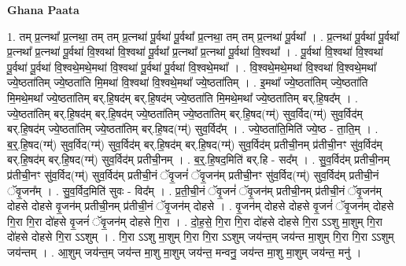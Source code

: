 \documentclass[17pt]{extarticle}
\begin{document}
\textbf{Ghana Paata } \newline

1. तम् प्र॒त्नथा᳚ प्र॒त्नथा॒ तम् तम् प्र॒त्नथा॑ पू॒र्वथा॑ पू॒र्वथा᳚ प्र॒त्नथा॒ तम् तम् प्र॒त्नथा॑ पू॒र्वथा᳚ । . प्र॒त्नथा॑ पू॒र्वथा॑ पू॒र्वथा᳚ प्र॒त्नथा᳚ प्र॒त्नथा॑ पू॒र्वथा॑ वि॒श्वथा॑ वि॒श्वथा॑ पू॒र्वथा᳚ प्र॒त्नथा᳚ प्र॒त्नथा॑ पू॒र्वथा॑ वि॒श्वथा᳚ । . पू॒र्वथा॑ वि॒श्वथा॑ वि॒श्वथा॑ पू॒र्वथा॑ पू॒र्वथा॑ वि॒श्वथे॒मथे॒मथा॑ वि॒श्वथा॑ पू॒र्वथा॑ पू॒र्वथा॑ वि॒श्वथे॒मथा᳚ । . वि॒श्वथे॒मथे॒मथा॑ वि॒श्वथा॑ वि॒श्वथे॒मथा᳚ ज्ये॒ष्ठता॑तिम् ज्ये॒ष्ठता॑ति मि॒मथा॑ वि॒श्वथा॑ वि॒श्वथे॒मथा᳚ ज्ये॒ष्ठता॑तिम् । . इ॒मथा᳚ ज्ये॒ष्ठता॑तिम् ज्ये॒ष्ठता॑ति मि॒मथे॒मथा᳚ ज्ये॒ष्ठता॑तिम् बर्.हि॒षद॑म् बर्.हि॒षद॑म् ज्ये॒ष्ठता॑ति मि॒मथे॒मथा᳚ ज्ये॒ष्ठता॑तिम् बर्.हि॒षद᳚म् । . ज्ये॒ष्ठता॑तिम् बर्.हि॒षद॑म् बर्.हि॒षद॑म् ज्ये॒ष्ठता॑तिम् ज्ये॒ष्ठता॑तिम् बर्.हि॒षद(ग्म्॑) सुव॒र्विद(ग्म्॑) सुव॒र्विद॑म् बर्.हि॒षद॑म् ज्ये॒ष्ठता॑तिम् ज्ये॒ष्ठता॑तिम् बर्.हि॒षद(ग्म्॑) सुव॒र्विद᳚म् । . ज्ये॒ष्ठता॑ति॒मिति॑ ज्ये॒ष्ठ - ता॒ति॒म् । . ब॒र्॒.हि॒षद(ग्म्॑) सुव॒र्विद(ग्म्॑) सुव॒र्विद॑म् बर्.हि॒षद॑म् बर्.हि॒षद(ग्म्॑) सुव॒र्विद॑म् प्रतीची॒नम् प्र॑तीची॒नꣳ सु॑व॒र्विद॑म् बर्.हि॒षद॑म् बर्.हि॒षद(ग्म्॑) सुव॒र्विद॑म् प्रतीची॒नम् । . ब॒र्॒.हि॒षद॒मिति॑ बर्.हि - सद᳚म् । . सु॒व॒र्विद॑म् प्रतीची॒नम् प्र॑तीची॒नꣳ सु॑व॒र्विद(ग्म्॑) सुव॒र्विद॑म् प्रतीची॒नं ॅवृ॒जनं॑ ॅवृ॒जन॑म् प्रतीची॒नꣳ सु॑व॒र्विद(ग्म्॑) सुव॒र्विद॑म् प्रतीची॒नं ॅवृ॒जन᳚म् । . सु॒व॒र्विद॒मिति॑ सुवः - विद᳚म् । . प्र॒ती॒ची॒नं ॅवृ॒जनं॑ ॅवृ॒जन॑म् प्रतीची॒नम् प्र॑तीची॒नं ॅवृ॒जन॑म् दोहसे दोहसे वृ॒जन॑म् प्रतीची॒नम् प्र॑तीची॒नं ॅवृ॒जन॑म् दोहसे । . वृ॒जन॑म् दोहसे दोहसे वृ॒जनं॑ ॅवृ॒जन॑म् दोहसे गि॒रा गि॒रा दो॑हसे वृ॒जनं॑ ॅवृ॒जन॑म् दोहसे गि॒रा । . दो॒ह॒से॒ गि॒रा गि॒रा दो॑हसे दोहसे गि॒रा ऽऽशु मा॒शुम् गि॒रा दो॑हसे दोहसे गि॒रा ऽऽशुम् । . गि॒रा ऽऽशु मा॒शुम् गि॒रा गि॒रा ऽऽशुम् जय॑न्त॒म् जय॑न्त मा॒शुम् गि॒रा गि॒रा ऽऽशुम् जय॑न्तम् । . आ॒शुम् जय॑न्त॒म् जय॑न्त मा॒शु मा॒शुम् जय॑न्त॒ मन्वनु॒ जय॑न्त मा॒शु मा॒शुम् जय॑न्त॒ मनु॑ । \newline
\end{document}
